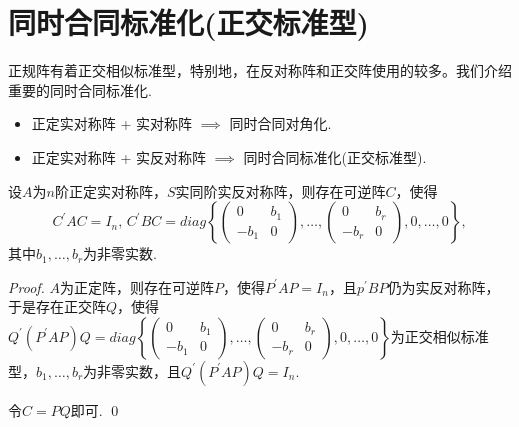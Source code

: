\section{同时合同标准化(正交标准型)}

正规阵有着正交相似标准型，特别地，在反对称阵和正交阵使用的较多。我们介绍重要的同时合同标准化.

\begin{itemize}
	\item 正定实对称阵 + 实对称阵 $\implies$ 同时合同对角化.
	\item 正定实对称阵 + 实反对称阵 $\implies$ 同时合同标准化(正交标准型).
\end{itemize}

\begin{lemma}[同时合同标准化]
	设$A$为$n$阶正定实对称阵，$S$实同阶实反对称阵，则存在可逆阵$C$，使得
	$$
		C^\prime A C = I_n, \, C^\prime B C = diag\left\{ \begin{pmatrix}
			0 & b_1 \\
			-b_1 & 0
		\end{pmatrix}, \dots, \begin{pmatrix}
			0 & b_r \\
			-b_r & 0
		\end{pmatrix},0,\dots, 0\right\},
	$$
	其中$b_1,\dots,b_r$为非零实数.
\end{lemma}

\begin{proof}
	$A$为正定阵，则存在可逆阵$P$，使得$P^\prime A P =I_n$，且$p^\prime B P$仍为实反对称阵，
	于是存在正交阵$Q$，使得$Q^\prime (P^\prime A P) Q=diag\left\{ \begin{pmatrix}
		0 & b_1 \\
		-b_1 & 0
	\end{pmatrix}, \dots, \begin{pmatrix}
		0 & b_r \\
		-b_r & 0
	\end{pmatrix},0,\dots, 0\right\}$为正交相似标准型，$b_1,\dots,b_r$为非零实数，且$Q^\prime (P^\prime A P)Q=I_n$.
	
	令$C=PQ$即可. 
	\qed{}
\end{proof}